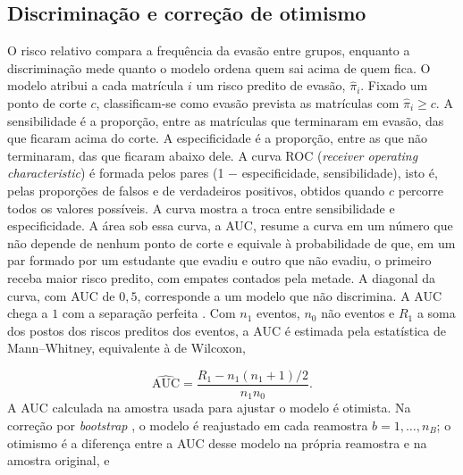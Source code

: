 \documentclass[12pt,a4paper]{article}
\begin{document}
\subsection{Discriminação e correção de otimismo}
\label{sec:fund-auc}

O risco relativo compara a frequência da evasão entre grupos, enquanto a discriminação mede quanto o modelo ordena quem sai acima de quem fica. O modelo atribui a cada matrícula $i$ um risco predito de evasão, $\hat{\pi}_i$. Fixado um ponto de corte $c$, classificam-se como evasão prevista as matrículas com $\hat{\pi}_i \ge c$. A sensibilidade é a proporção, entre as matrículas que terminaram em evasão, das que ficaram acima do corte. A especificidade é a proporção, entre as que não terminaram, das que ficaram abaixo dele. A curva ROC (\textit{receiver operating characteristic}) é formada pelos pares (1 $-$ especificidade, sensibilidade), isto é, pelas proporções de falsos e de verdadeiros positivos, obtidos quando $c$ percorre todos os valores possíveis. A curva mostra a troca entre sensibilidade e especificidade. A área sob essa curva, a AUC, resume a curva em um número que não depende de nenhum ponto de corte e equivale à probabilidade de que, em um par formado por um estudante que evadiu e outro que não evadiu, o primeiro receba maior risco predito, com empates contados pela metade. A diagonal da curva, com AUC de $0{,}5$, corresponde a um modelo que não discrimina. A AUC chega a $1$ com a separação perfeita \citep[pp.~30--33]{hanley1982meaning}. Com $n_1$ eventos, $n_0$ não eventos e $R_1$ a soma dos postos dos riscos preditos dos eventos, a AUC é estimada pela estatística de Mann–Whitney, equivalente à de Wilcoxon,

\begin{equation}
  \widehat{\text{AUC}} = \frac{R_1 - n_1(n_1+1)/2}{n_1 n_0}.
\end{equation}
A AUC calculada na amostra usada para ajustar o modelo é otimista. Na correção por \textit{bootstrap} \citep[p.~372]{efron1993introduction,harrell1996multivariable}, o modelo é reajustado em cada reamostra $b = 1, \dots, n_B$; o otimismo é a diferença entre a AUC desse modelo na própria reamostra e na amostra original, e
\end{document}
